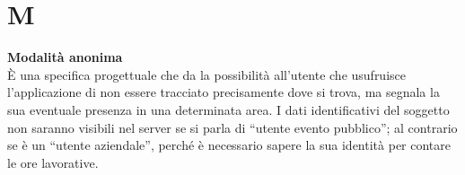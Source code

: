 \section{M}
\textbf{Modalità anonima}\\
È una specifica progettuale che da la possibilità all’utente che usufruisce l’applicazione di non essere tracciato precisamente dove si trova, ma segnala la sua eventuale presenza in una determinata area. I dati identificativi del soggetto non saranno visibili nel server se si parla di “utente evento pubblico”; al contrario se è un “utente aziendale”, perché è necessario sapere la sua identità per contare le ore lavorative.

\clearpage